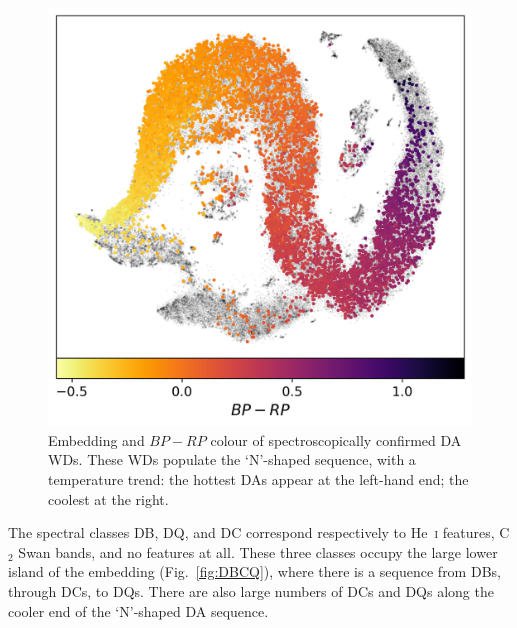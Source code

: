 \documentclass[fleqn,usenatbib]{rasti}
\begin{document}
\begin{figure}
\centering
\includegraphics[width=\columnwidth]{figures/fig4_DAsequence.png}
\caption{
    Embedding and $\mathit{BP}-\mathit{RP}$ colour of spectroscopically confirmed DA WDs.
    These WDs populate the `N'-shaped sequence, with a temperature trend: the hottest DAs appear at the left-hand end; the coolest at the right.
}
\label{fig:DAs}
\end{figure}


The spectral classes DB, DQ, and DC correspond respectively to He~\textsc{i} features, C$_2$ Swan bands, and no features at all.
These three classes occupy the large lower island of the embedding (Fig.~\ref{fig:DBCQ}), where there is a sequence from DBs, through DCs, to DQs.
There are also large numbers of DCs and DQs along the cooler end of the `N'-shaped DA sequence.
\end{document}
